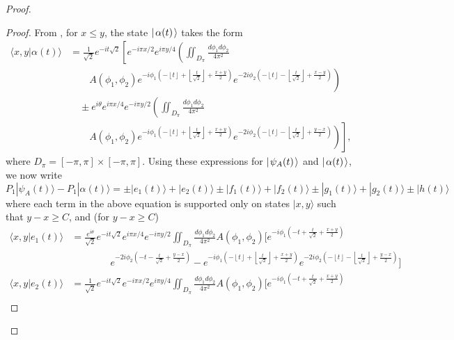 \documentclass[../thesis-main/thesis-main]{subfiles}
\begin{document}
\begin{proof}
\begin{proof}
From , for $x\leq y$, the state $|\mspace{2mu} \alpha(t) \mspace{2mu} \rangle$ takes the form
\begin{align*}
\langle x,y|\alpha(t)\rangle & = \frac{1}{\sqrt{2}}e^{-it\sqrt{2}}\left[ e^{-i\pi x /2}e^{i \pi y/4}  
	\left(\iint_{D_{\pi}}\frac{d\phi_{1}d\phi_{2}}{4\pi^{2}}\right.\right.\\
 &	\qquad  \left.\left. A(\phi_{1},\phi_{2}) 		
	e^{- i\phi_{1}\left(-\left\lfloor t\right\rfloor +\left\lfloor \frac{t}{\sqrt{2}}\right\rfloor +\frac{x+y}
	{2}\right)}e^{-2i\phi_{2}\left(-\left\lfloor t\right\rfloor -\left\lfloor \frac{t}{\sqrt{2}}\right\rfloor +\frac{x-y}
	{2}\right)}\right)\right.\\
 & \quad \pm e^{i\theta} e^{i\pi x/4}e^{-i \pi y/2} 
 	\left(\iint_{D_{\pi}}\frac{d\phi_{1}d\phi_{2}}{4\pi^{2}}\right.\\
 & \qquad \left.\left. A(\phi_{1},\phi_{2})
 	e^{-i\phi_{1}\left(-\left\lfloor t\right\rfloor +\left\lfloor \frac{t}{\sqrt{2}}\right\rfloor +\frac{x+y}{2}\right)}
 	e^{-2i\phi_{2}\left(-\left\lfloor t\right\rfloor -\left\lfloor \frac{t}{\sqrt{2}}\right\rfloor +\frac{y-x}
 	{2}\right)}\right)\right],
 \end{align*}
 where $D_{\pi}=[-\pi,\pi]\times[-\pi,\pi]$. Using these expressions for $|\mspace{2mu} \psi_A(t) \mspace{2mu} \rangle$ and $|\mspace{2mu} \alpha(t) \mspace{2mu} \rangle$,
we now write 
\[
P_{1}|\psi_{A}(t)\rangle-P_{1}|\alpha(t)\rangle=\pm |e_{1}(t)\rangle+|e_{2}(t)\rangle \pm|f_{1}(t)\rangle+|f_{2}(t)\rangle\pm|g_{1}(t)\rangle+|g_{2}(t)\rangle\pm|h(t)\rangle
\]
where each term in the above equation is supported only on states
$|x,y\rangle$ such that $y-x \geq C$, and (for $y - x \geq C$)
\begin{align*}
\langle x,y|e_{1}(t)\rangle & = 
	\frac{e^{i\theta}}{\sqrt{2}} e^{-it\sqrt{2}}
	e^{i \pi x/4}e^{-i\pi y/2}\iint_{D_{\pi}}\frac{d\phi_{1}d\phi_{2}}{4\pi^{2}}
	A(\phi_{1},\phi_{2}) \bigg[e^{-i\phi_{1}\left(-t+\frac{t}{\sqrt{2}}+\frac{x+y}{2}\right)}\\
&  \qquad\qquad e^{-2i\phi_{2}\left(-t-\frac{t}{\sqrt{2}}+\frac{y-x}{2}\right)}
	-e^{-i\phi_{1}\left(-\left\lfloor t\right\rfloor +\left\lfloor \frac{t}{\sqrt{2}}\right\rfloor +\frac{x+y}{2}
 		\right)}e^{-2i\phi_{2}\left(-\left\lfloor t\right\rfloor -\left\lfloor \frac{t}{\sqrt{2}}\right\rfloor 
 		+\frac{y-x}{2}\right)}\bigg]\\
\langle x,y|e_{2}(t)\rangle & = 
	\frac{1}{\sqrt{2}}e^{-it\sqrt{2}}e^{-i \pi x/2}e^{i\pi y/4}
	\iint_{D_{\pi}}\frac{d\phi_{1}d\phi_{2}}{4\pi^{2}}A(\phi_{1},\phi_{2})\bigg[e^{-i\phi_{1}
	\left(-t+\frac{t}{\sqrt{2}}+\frac{x+y}{2}\right)}\\

\end{align*}
\end{proof}
\end{proof}
\end{document}
